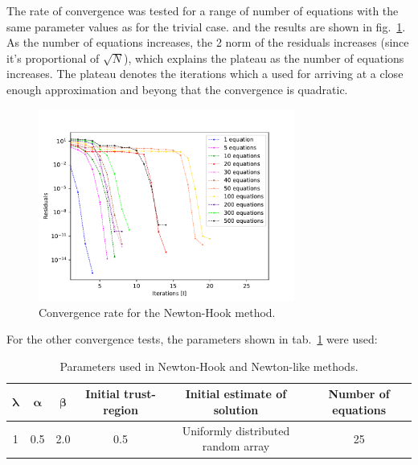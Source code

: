 \documentclass[11pt, oneside]{article}
\begin{document}
The rate of convergence was tested for a range of number of equations with the same parameter values as for the trivial case. and the results are shown  in fig.~\ref{fig:conv}. As the number of equations increases, the 2 norm of the residuals increases (since it's proportional of $\sqrt{N}$), which explains the plateau as the number of equations increases. The plateau denotes the iterations which a used for arriving at a close enough approximation and beyong that the convergence is quadratic.
\begin{figure}[h!]
  \centering
  \includegraphics[width=0.75\textwidth]{figures/convergence.pdf}
  \caption{Convergence rate for the Newton-Hook method.}
  \label{fig:conv}
\end{figure}

For the other convergence tests, the parameters shown in tab.~\ref{tab:parameters} were used:
\begin{table}[h!]
\centering
\caption{Parameters used in Newton-Hook and Newton-like methods.}
\begin{tabular}{cccccc}
\toprule
{$\boldsymbol{\lambda}$} & {$\boldsymbol{\alpha}$} & {$\boldsymbol{\beta}$} & \textbf{Initial trust-region}  & \textbf{Initial estimate of solution} & \textbf{Number of equations}\\
\midrule
1  & 0.5  & 2.0 & 0.5 & Uniformly distributed random array & 25 \\
\bottomrule
\end{tabular}
\label{tab:parameters}
\end{table}
\end{document}
